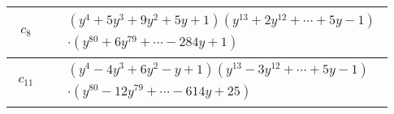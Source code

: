 \documentclass[1p]{elsarticle_modified}
\theoremstyle{definition}
\begin{document}
\begin{tabular}{m{50pt}|m{274pt}}
\hline $$\begin{aligned}c_{8}\end{aligned}$$&$\begin{aligned}
&(y^4+5 y^3+9 y^2+5 y+1)(y^{13}+2 y^{12}+\cdots+5 y-1)\\
&\cdot(y^{80}+6 y^{79}+\cdots-284 y+1)
\end{aligned}$\\
\hline $$\begin{aligned}c_{11}\end{aligned}$$&$\begin{aligned}
&(y^4-4 y^3+6 y^2- y+1)(y^{13}-3 y^{12}+\cdots+5 y-1)\\
&\cdot(y^{80}-12 y^{79}+\cdots-614 y+25)
\end{aligned}$\\
\hline
\end{tabular}
\vskip 2pc
\end{document}
